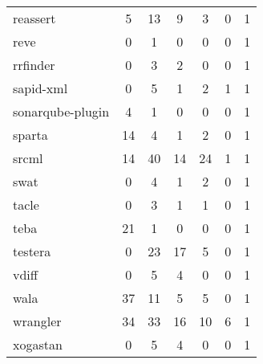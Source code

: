 \begin{table}[H]
\begin{tabular}{| l | c | c | c | c | c | c |}
  reassert
  &
  5
  &
  13
  &
  9
  &
  3
  &
  0
  &
  1
  \\
  reve
  &
  0
  &
  1
  &
  0
  &
  0
  &
  0
  &
  1
  \\
  rrfinder
  &
  0
  &
  3
  &
  2
  &
  0
  &
  0
  &
  1
  \\
  sapid-xml
  &
  0
  &
  5
  &
  1
  &
  2
  &
  1
  &
  1
  \\
  sonarqube-plugin
  &
  4
  &
  1
  &
  0
  &
  0
  &
  0
  &
  1
  \\
  sparta
  &
  14
  &
  4
  &
  1
  &
  2
  &
  0
  &
  1
  \\
  srcml
  &
  14
  &
  40
  &
  14
  &
  24
  &
  1
  &
  1
  \\
  swat
  &
  0
  &
  4
  &
  1
  &
  2
  &
  0
  &
  1
  \\
  tacle
  &
  0
  &
  3
  &
  1
  &
  1
  &
  0
  &
  1
  \\
  teba
  &
  21
  &
  1
  &
  0
  &
  0
  &
  0
  &
  1
  \\
  testera
  &
  0
  &
  23
  &
  17
  &
  5
  &
  0
  &
  1
  \\
  vdiff
  &
  0
  &
  5
  &
  4
  &
  0
  &
  0
  &
  1
  \\
  wala
  &
  37
  &
  11
  &
  5
  &
  5
  &
  0
  &
  1
  \\
  wrangler
  &
  34
  &
  33
  &
  16
  &
  10
  &
  6
  &
  1
  \\
  xogastan
  &
  0
  &
  5
  &
  4
  &
  0
  &
  0
  &
  1
  \\
  \hline
\end{tabular}
\end{table}

